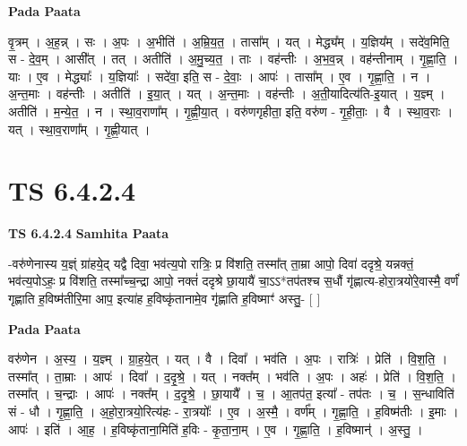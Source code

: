 \documentclass[17pt]{extarticle}
\begin{document}
\textbf{Pada Paata} \newline

वृ॒त्रम् । अ॒ह॒न्न् । सः । अ॒पः । अ॒भीति॑ । अ॒म्रि॒य॒त॒ । तासा᳚म् । यत् । मेद्ध्य᳚म् । य॒ज्ञिय᳚म् । सदे॑व॒मिति॒ स - दे॒व॒म् । आसी᳚त् । तत् । अतीति॑ । अ॒मु॒च्य॒त॒ । ताः । वह॑न्तीः । अ॒भ॒व॒न्न् । वह॑न्तीनाम् । गृ॒ह्णा॒ति॒ । याः । ए॒व । मेद्ध्याः᳚ । य॒ज्ञियाः᳚ । सदे॑वा॒ इति॒ स - दे॒वाः॒ । आपः॑ । तासा᳚म् । ए॒व । गृ॒ह्णा॒ति॒ । न । अ॒न्त॒माः । वह॑न्तीः । अतीति॑ । इ॒या॒त् । यत् । अ॒न्त॒माः । वह॑न्तीः । अ॒ती॒यादित्य॑ति-इ॒यात् । य॒ज्ञ्म् । अतीति॑ । म॒न्ये॒त॒ । न । स्था॒व॒राणा᳚म् । गृ॒ह्णी॒या॒त् । वरु॑णगृहीता॒ इति॒ वरु॑ण - गृ॒ही॒ताः॒ । वै । स्था॒व॒राः । यत् । स्था॒व॒राणा᳚म् । गृ॒ह्णी॒यात् ।  \newline





\section{ TS 6.4.2.4 }

\textbf{TS 6.4.2.4 } \newline
\textbf{Samhita Paata} \newline

-वरु॑णेनास्य य॒ज्ञ्ं ग्रा॑हये॒द् यद्वै दिवा॒ भव॑त्य॒पो रात्रिः॒ प्र वि॑शति॒ तस्मा᳚त् ता॒म्रा आपो॒ दिवा॑ ददृश्रे॒ यन्नक्तं॒ भव॑त्य॒पोऽहः॒ प्र वि॑शति॒ तस्मा᳚च्च॒न्द्रा आपो॒ नक्तं॑ ददृश्रे छा॒यायै॑ चा॒ऽऽ*तप॑तश्च स॒धौं गृ॑ह्णात्य-होरा॒त्रयो॑रे॒वास्मै॒ वर्णं॑ गृह्णाति ह॒विष्म॑तीरि॒मा आप॒ इत्या॑ह ह॒विष्कृ॑तानामे॒व गृ॑ह्णाति ह॒विष्माꣳ॑ अस्तु॒- [  ] \newline

\textbf{Pada Paata} \newline

वरु॑णेन । अ॒स्य॒ । य॒ज्ञ्म् । ग्रा॒ह॒ये॒त् । यत् । वै । दिवा᳚ । भव॑ति । अ॒पः । रात्रिः॑ । प्रेति॑ । वि॒श॒ति॒ । तस्मा᳚त् । ता॒म्राः । आपः॑ । दिवा᳚ । द॒दृ॒श्रे॒ । यत् । नक्त᳚म् । भव॑ति । अ॒पः । अहः॑ । प्रेति॑ । वि॒श॒ति॒ । तस्मा᳚त् । च॒न्द्राः । आपः॑ । नक्त᳚म् । द॒दृ॒श्रे॒ । छा॒यायै᳚ । च॒ । आ॒तप॑त॒ इत्या᳚ - तप॑तः । च॒ । स॒न्धाविति॑ सं - धौ । गृ॒ह्णा॒ति॒ । अ॒हो॒रा॒त्रयो॒रित्य॑हः - रा॒त्रयोः᳚ । ए॒व । अ॒स्मै॒ । वर्ण᳚म् । गृ॒ह्णा॒ति॒ । ह॒विष्म॑तीः । इ॒माः । आपः॑ । इति॑ । आ॒ह॒ । ह॒विष्कृ॑ताना॒मिति॑ ह॒विः - कृ॒ता॒ना॒म् । ए॒व । गृ॒ह्णा॒ति॒ । ह॒विष्मान्॑ । अ॒स्तु॒ ।  \newline




\end{document}
